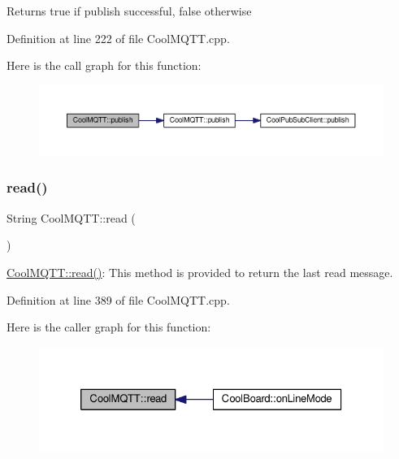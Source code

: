 \begin{DoxyReturn}{Returns}
true if publish successful, false otherwise 
\end{DoxyReturn}


Definition at line 222 of file Cool\+M\+Q\+T\+T.\+cpp.

Here is the call graph for this function\+:\nopagebreak
\begin{figure}[H]
\begin{center}
\leavevmode
\includegraphics[width=350pt]{class_cool_m_q_t_t_a613c5e3927ae85bb94fbf648d84d8780_cgraph}
\end{center}
\end{figure}
\mbox{\label{class_cool_m_q_t_t_ae3c18f6ae9723746d32765f1c8f176ca}} 
\subsubsection{\texorpdfstring{read()}{read()}}
{\footnotesize\ttfamily String Cool\+M\+Q\+T\+T\+::read (\begin{DoxyParamCaption}{ }\end{DoxyParamCaption})}

\hyperlink{class_cool_m_q_t_t_ae3c18f6ae9723746d32765f1c8f176ca}{Cool\+M\+Q\+T\+T\+::read()}\+: This method is provided to return the last read message. 

Definition at line 389 of file Cool\+M\+Q\+T\+T.\+cpp.

Here is the caller graph for this function\+:\nopagebreak
\begin{figure}[H]
\begin{center}
\leavevmode
\includegraphics[width=326pt]{class_cool_m_q_t_t_ae3c18f6ae9723746d32765f1c8f176ca_icgraph}
\end{center}
\end{figure}
\mbox{\label{class_cool_m_q_t_t_a5d003307eff78efbd585e42b43b72b6d}} 
